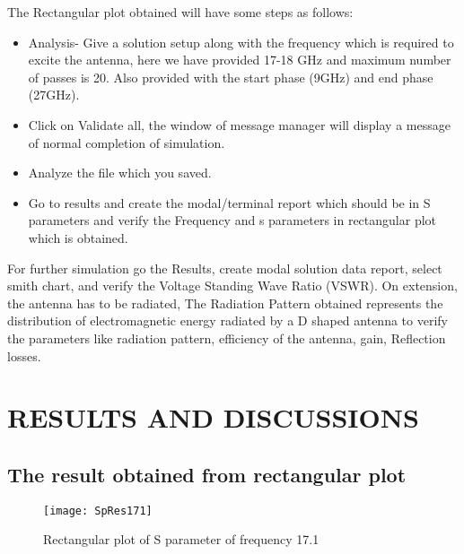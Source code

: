\documentclass[12pt]{article}
\begin{document}
\par The Rectangular plot obtained will have some steps as follows:

\begin{itemize}
    \item Analysis- Give a solution setup along with the frequency which is required to excite the antenna, here we have provided 17-18 GHz and maximum number of passes is 20. Also provided with the start phase (9GHz) and end phase (27GHz).
    \item Click on Validate all, the window of message manager will display a message of normal completion of simulation.
    \item Analyze the file which you saved.
    \item Go to results and create the modal/terminal report which should be in S parameters and verify the
Frequency and s parameters in rectangular plot which is obtained.
\end{itemize}

\par For further simulation go the Results, create modal solution data report, select smith chart, and verify the Voltage Standing Wave Ratio (VSWR).
On extension, the antenna has to be radiated, The Radiation Pattern obtained represents the distribution of electromagnetic energy radiated by a D shaped antenna to verify the parameters like radiation pattern, efficiency of the antenna, gain, Reflection losses.


\newpage
\section{RESULTS AND DISCUSSIONS}
\subsection{The result obtained from rectangular plot}

\begin{center}
\begin{figure}[H]
    \centering
    \texttt{[image: SpRes171]}
    \caption{Rectangular plot of S parameter of frequency 17.1}
    \label{fig:Rectangular plot of S parameter of frequency 17.1}
\end{figure}
\end{center}
\end{document}
